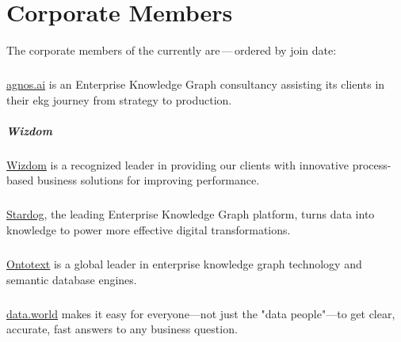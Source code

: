 \chapter{Corporate Members}
\label{appendix:ekgf-corporate-members}

The corporate members of the  currently are\,---\,ordered by join date:

\paragraph{\agnos}
\label{agnos}

\href{https://agnos.ai}{agnos.ai} is an Enterprise Knowledge Graph consultancy assisting its clients in
their \gls{ekg} journey from strategy to production.

\paragraph{Wizdom}
\label{wizdom}

\href{http://www.wizdom.com/}{Wizdom} is a recognized leader in providing our clients with
innovative process-based business solutions for improving performance.

\paragraph{\stardogcompany}
\label{stardog}

\href{https://www.stardog.com/}{Stardog}, the leading Enterprise Knowledge Graph platform,
turns data into knowledge to power more effective digital transformations.

\paragraph{\ontotext}
\label{ontotext}

\href{https://www.ontotext.com/}{Ontotext} is a global leader in enterprise knowledge graph technology
and semantic database engines.

\paragraph{\dataworld}
\label{dataworld}

\href{https://data.world}{data.world} makes it easy for everyone—not just the "data people"—to get clear, accurate,
fast answers to any business question.

